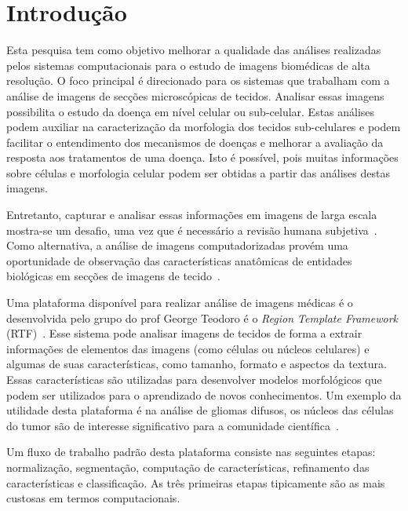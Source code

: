 \documentclass[a4paper,10pt]{article}
\begin{document}
	
	
\section{Introdução}


Esta pesquisa tem como objetivo melhorar a qualidade das análises realizadas pelos sistemas computacionais para o estudo de imagens biomédicas de alta resolução. O foco principal é direcionado para os sistemas que trabalham com a análise de imagens de secções microscópicas de tecidos. Analisar essas imagens possibilita o estudo da doença em nível celular ou sub-celular. Estas análises podem auxiliar na caracterização da morfologia dos tecidos sub-celulares e podem facilitar o entendimento dos mecanismos de doenças e melhorar a avaliação da resposta aos tratamentos de uma doença. Isto é possível, pois muitas informações sobre células e morfologia celular podem ser obtidas a partir das análises destas imagens.

Entretanto, capturar e analisar essas informações em imagens de larga escala mostra-se um desafio, uma vez que é necessário a revisão humana subjetiva~\cite{kong2011comprehensive}. Como alternativa, a análise de imagens computadorizadas provém uma oportunidade de observação das características anatômicas de entidades biológicas em secções de imagens de tecido~\cite{kong2010texture}.

Uma plataforma disponível para realizar análise de imagens médicas é o desenvolvida pelo grupo do prof George Teodoro é o \textit{Region Template Framework} (RTF)~\cite{teodoro2014region}. Esse sistema pode analisar imagens de tecidos de forma a extrair informações de elementos das imagens (como células ou núcleos celulares) e algumas de suas características, como tamanho, formato e aspectos da textura. Essas características são utilizadas para desenvolver modelos morfológicos que podem ser utilizados para o aprendizado de novos conhecimentos. Um exemplo da utilidade desta plataforma é na análise de gliomas difusos, os núcleos das células do tumor são de interesse significativo para a comunidade científica~\cite{gupta2005clarifying}.

Um fluxo de trabalho padrão desta plataforma consiste nas seguintes etapas: normalização, segmentação, computação de características, refinamento das características e classificação. As três primeiras etapas tipicamente são as mais custosas em termos computacionais. 
\end{document}
